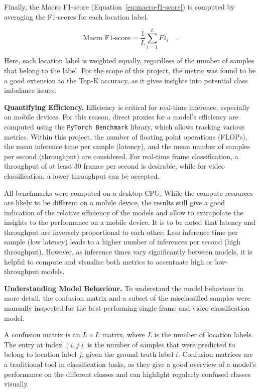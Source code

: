 \documentclass[a4paper]{article}
\begin{document}
Finally, the Macro F1-score (Equation~\ref{eq:macro-f1-score}) is computed by
averaging the F1-scores for each location label.

\begin{equation}
  \text{Macro F1-score} = \frac{1}{L} \sum_{i=1}^{L} F1_i \quad .
  \label{eq:macro-f1-score}
\end{equation}

Here, each location label is weighted equally, regardless of the number of
samples that belong to the label. For the scope of this project, the metric was
found to be a good extension to the Top-K accuracy, as it gives insights into
potential class imbalance issues.

\textbf{Quantifying Efficiency.} Efficiency is critical for real-time inference,
especially on mobile devices. For this reason, direct proxies for a model's
efficiency are computed using the \texttt{PyTorch Benchmark} library, which
allows tracking various metrics. Within this project, the number of floating
point operations (FLOPs), the mean inference time per sample (latency), and the
mean number of samples per second (throughput) are considered. For real-time
frame classification, a throughput of at least 30 frames per second is
desirable, while for video classification, a lower throughput can be accepted.

All benchmarks were computed on a desktop CPU. While the compute resources are
likely to be different on a mobile device, the results still give a good
indication of the relative efficiency of the models and allow to extrapolate the
insights to the performance on a mobile device. It is to be noted that latency
and throughput are inversely proportional to each other: Less inference time per
sample (low latency) leads to a higher number of inferences per second (high
throughput). However, as inference times vary significantly between models, it is
helpful to compute and visualise both metrics to accentuate high or
low-throughput models.

\textbf{Understanding Model Behaviour.}  To understand the model behaviour in
more detail, the confusion matrix and a subset of the misclassified samples were
manually inspected for the best-performing single-frame and video classification
model. 

A confusion matrix is an $L \times L$ matrix, where $L$ is the number of
location labels. The entry at index $(i,j)$ is the number of samples that were
predicted to belong to location label $j$, given the ground truth label $i$.
Confusion matrices are a traditional tool in classification tasks, as they give
a good overview of a model's performance on the different classes and can
highlight regularly confused classes visually.
\end{document}
